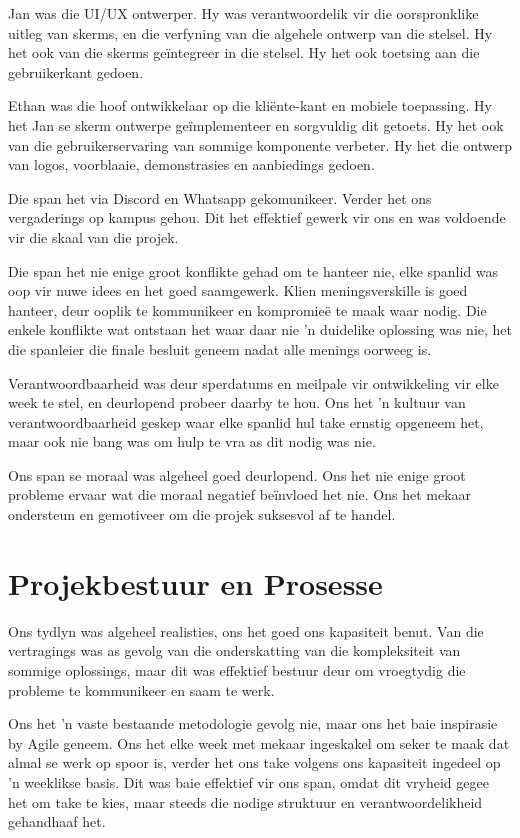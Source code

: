 Jan was die UI/UX ontwerper. Hy was verantwoordelik vir die oorspronklike uitleg
van skerms, en die verfyning van die algehele ontwerp van die stelsel. Hy
het ook van die skerms geïntegreer in die stelsel. Hy het ook toetsing aan die gebruikerkant gedoen.

Ethan was die hoof ontwikkelaar op die kliënte-kant en mobiele toepassing.
Hy het Jan se skerm ontwerpe geïmplementeer en sorgvuldig dit getoets. Hy het
ook van die gebruikerservaring van sommige komponente verbeter. Hy het die
ontwerp van logos, voorblaaie, demonstrasies en aanbiedings gedoen.

Die span het via Discord en Whatsapp gekomunikeer. Verder het ons vergaderings
op kampus gehou. Dit het effektief gewerk vir ons en was voldoende vir die skaal
van die projek.

Die span het nie enige groot konflikte gehad om te hanteer nie, elke spanlid
was oop vir nuwe idees en het goed saamgewerk. Klien meningsverskille is
goed hanteer, deur ooplik te kommunikeer en kompromieë te maak waar nodig.
Die enkele konflikte wat ontstaan het waar daar nie 'n duidelike oplossing was
nie, het die spanleier die finale besluit geneem nadat alle menings oorweeg is.

Verantwoordbaarheid was deur sperdatums en meilpale vir ontwikkeling vir elke
week te stel, en deurlopend probeer daarby te hou. Ons het 'n kultuur van 
verantwoordbaarheid geskep waar elke spanlid hul take ernstig opgeneem het, maar
ook nie bang was om hulp te vra as dit nodig was nie.

Ons span se moraal was algeheel goed deurlopend. Ons het nie enige groot
probleme ervaar wat die moraal negatief beïnvloed het nie. Ons het mekaar
ondersteun en gemotiveer om die projek suksesvol af te handel.

\section{Projekbestuur en Prosesse}

Ons tydlyn was algeheel realisties, ons het goed ons kapasiteit benut. Van die vertragings was as gevolg van die onderskatting van die kompleksiteit van sommige oplossings, maar dit was effektief bestuur deur om vroegtydig die probleme te kommunikeer en saam te werk.

Ons het 'n vaste bestaande metodologie gevolg nie, maar ons het baie inspirasie
by Agile geneem. Ons het elke week met mekaar ingeskakel om seker te maak dat
almal se werk op spoor is, verder het ons take volgens ons kapasiteit ingedeel
op 'n weeklikse basis. Dit was baie effektief vir ons span, omdat dit vryheid
gegee het om take te kies, maar steeds die nodige struktuur en verantwoordelikheid gehandhaaf het.

